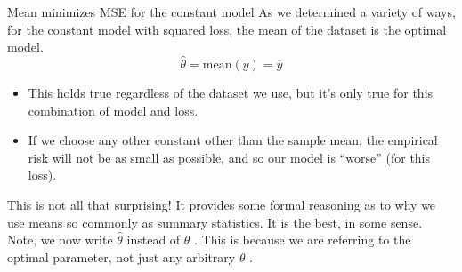 \documentclass[aspectratio=169]{../latex_main/tntbeamer}  %
\begin{document}
	
	
	\begin{frame}{Mean minimizes MSE for the constant model}
	    As we determined a variety of ways, for the constant model with squared loss, the mean of the dataset is the optimal model.
	    \begin{equation*}
	        \hat{\theta} = \text{mean}(y) = \overline{y}
	    \end{equation*}
	    \begin{itemize}
	        \item This holds true regardless of the dataset we use, but it’s only true for this combination of model and loss.
	        \item If we choose any other constant other than the sample mean, the empirical risk will not be as small as possible, and so our model is “worse” (for this loss).
	    \end{itemize}
	    This is not all that surprising! It provides some formal reasoning as to why we use means so commonly as summary statistics. It is the best, in some sense.\\
	    Note, we now write  $\hat{\theta}$   instead of  $\theta$    . This is because we are referring to the optimal parameter, not just any arbitrary  $\theta$    . 
	\end{frame}
\end{document}
